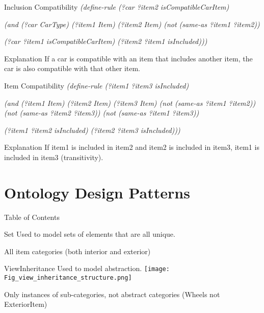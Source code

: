 \documentclass{beamer}
\begin{document}
\begin{frame}{Inclusion Compatibility}
    \textit{(define-rule (?car ?item2 isCompatibleCarItem)}
    
    \textit{(and (?car CarType) (?item1 Item) (?item2 Item) (not (same-as ?item1 ?item2))}
    
    \textit{(?car ?item1 isCompatibleCarItem) (?item2 ?item1 isIncluded))) }
    
    \begin{block}{Explanation}
        If a car is compatible with an item that includes another item, the car is also compatible with that other item.
    \end{block}
     
\end{frame}

\begin{frame}{Item Compatibility}
    \textit{(define-rule (?item1 ?item3 isIncluded)}
    
    \textit{(and (?item1 Item) (?item2 Item) (?item3 Item) (not (same-as ?item1 ?item2)) (not (same-as ?item2 ?item3)) (not (same-as ?item1 ?item3))}
    
    \textit{(?item1 ?item2 isIncluded) (?item2 ?item3 isIncluded))) }
    
    \begin{block}{Explanation}
        If item1 is included in item2 and item2 is included in item3, item1 is included in item3 (transitivity).
    \end{block}
     
\end{frame}

\section{Ontology Design Patterns}
\begin{frame}{Table of Contents}
    \tableofcontents[currentsection]
\end{frame}

\begin{frame}{Set}
    Used to model sets of elements that are all unique.
    \begin{examples}
        All item categories (both interior and exterior)
    \end{examples}
\end{frame}

\begin{frame}{ViewInheritance}
    Used to model abstraction.
    \texttt{[image: Fig\_view\_inheritance\_structure.png]}
    \begin{examples}
        Only instances of sub-categories, not abstract categories (Wheels not ExteriorItem)
    \end{examples}
    
\end{frame}
\end{document}
